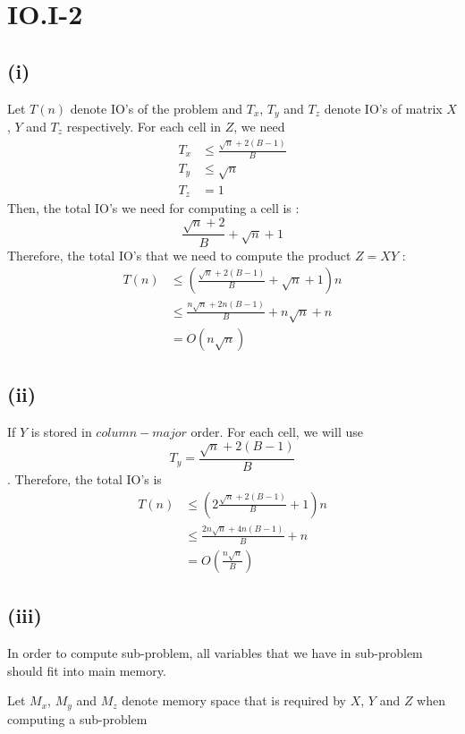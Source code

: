\section*{IO.I-2}
\subsection*{(i)}
Let $T(n)$ denote IO's of the problem and $T_x$, $T_y$ and $T_z$ denote IO's of matrix $X$, $Y$ and $T_z$ respectively.
For each cell in $Z$, we need
\begin{align*}
	T_x &\leq \frac{\sqrt{n}+2(B-1)}{B}\\
	T_y &\leq \sqrt{n} \\
	T_z &= 1
\end{align*}
Then, the total IO's we need for computing a cell is :
$$\frac{\sqrt{n}+2}{B} + \sqrt{n} + 1$$
Therefore, the total IO's that we need to compute the product $Z=XY$ :
\begin{align*}
	T(n) &\leq ( \frac{\sqrt{n}+2(B-1)}{B} + \sqrt{n} + 1	)n\\
	&\leq \frac{n\sqrt{n}+2n(B-1)}{B} + n\sqrt{n} + n \\
	&= O(n\sqrt{n})
\end{align*}

\subsection*{(ii)}
If $Y$ is stored in $column-major$ order. For each cell, we will use $$T_y=\frac{\sqrt{n}+2(B-1)}{B}$$.
Therefore, the total IO's is
\begin{align*}
	T(n) &\leq ( 2\frac{\sqrt{n}+2(B-1)}{B} + 1	)n\\
	&\leq \frac{2n\sqrt{n}+4n(B-1)}{B} + n \\
	&= O(\frac{n\sqrt{n}}{B})
\end{align*}

\subsection*{(iii)}


In order to compute sub-problem, all variables that we have in sub-problem should fit into main memory. 

Let $M_x$, $M_y$ and $M_z$ denote memory space that is required by $X$, $Y$ and $Z$ when computing a sub-problem

